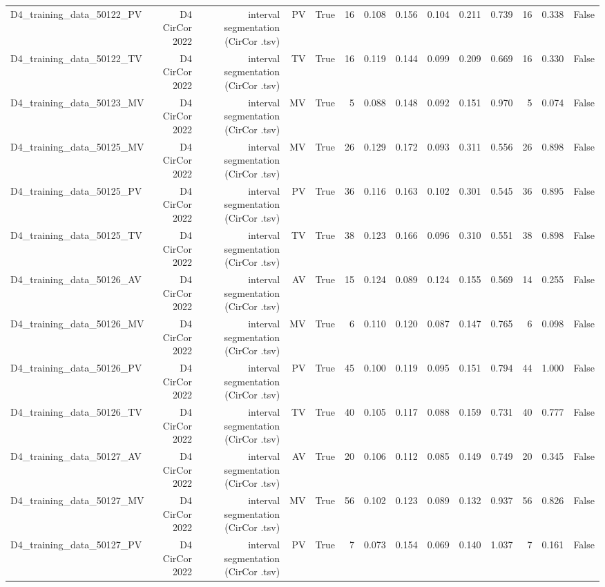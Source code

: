 \begin{table}[htbp]
\begin{tabular}{lrrrrrrrrrrrrr}
    D4\_training\_data\_50122\_PV & D4 CirCor 2022 & interval segmentation (CirCor .tsv) & PV & True & 16 & 0.108 & 0.156 & 0.104 & 0.211 & 0.739 & 16 & 0.338 & False \\
    D4\_training\_data\_50122\_TV & D4 CirCor 2022 & interval segmentation (CirCor .tsv) & TV & True & 16 & 0.119 & 0.144 & 0.099 & 0.209 & 0.669 & 16 & 0.330 & False \\
    D4\_training\_data\_50123\_MV & D4 CirCor 2022 & interval segmentation (CirCor .tsv) & MV & True & 5 & 0.088 & 0.148 & 0.092 & 0.151 & 0.970 & 5 & 0.074 & False \\
    D4\_training\_data\_50125\_MV & D4 CirCor 2022 & interval segmentation (CirCor .tsv) & MV & True & 26 & 0.129 & 0.172 & 0.093 & 0.311 & 0.556 & 26 & 0.898 & False \\
    D4\_training\_data\_50125\_PV & D4 CirCor 2022 & interval segmentation (CirCor .tsv) & PV & True & 36 & 0.116 & 0.163 & 0.102 & 0.301 & 0.545 & 36 & 0.895 & False \\
    D4\_training\_data\_50125\_TV & D4 CirCor 2022 & interval segmentation (CirCor .tsv) & TV & True & 38 & 0.123 & 0.166 & 0.096 & 0.310 & 0.551 & 38 & 0.898 & False \\
    D4\_training\_data\_50126\_AV & D4 CirCor 2022 & interval segmentation (CirCor .tsv) & AV & True & 15 & 0.124 & 0.089 & 0.124 & 0.155 & 0.569 & 14 & 0.255 & False \\
    D4\_training\_data\_50126\_MV & D4 CirCor 2022 & interval segmentation (CirCor .tsv) & MV & True & 6 & 0.110 & 0.120 & 0.087 & 0.147 & 0.765 & 6 & 0.098 & False \\
    D4\_training\_data\_50126\_PV & D4 CirCor 2022 & interval segmentation (CirCor .tsv) & PV & True & 45 & 0.100 & 0.119 & 0.095 & 0.151 & 0.794 & 44 & 1.000 & False \\
    D4\_training\_data\_50126\_TV & D4 CirCor 2022 & interval segmentation (CirCor .tsv) & TV & True & 40 & 0.105 & 0.117 & 0.088 & 0.159 & 0.731 & 40 & 0.777 & False \\
    D4\_training\_data\_50127\_AV & D4 CirCor 2022 & interval segmentation (CirCor .tsv) & AV & True & 20 & 0.106 & 0.112 & 0.085 & 0.149 & 0.749 & 20 & 0.345 & False \\
    D4\_training\_data\_50127\_MV & D4 CirCor 2022 & interval segmentation (CirCor .tsv) & MV & True & 56 & 0.102 & 0.123 & 0.089 & 0.132 & 0.937 & 56 & 0.826 & False \\
    D4\_training\_data\_50127\_PV & D4 CirCor 2022 & interval segmentation (CirCor .tsv) & PV & True & 7 & 0.073 & 0.154 & 0.069 & 0.140 & 1.037 & 7 & 0.161 & False \\

\end{tabular}
\end{table}

